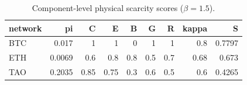 \begin{table}
\caption{Component-level physical scarcity scores ($\beta=1.5$).}
\label{tab:scarcity}
\begin{tabular}{lrrrrrrrr}
\toprule
network & pi & C & E & B & G & R & kappa & S \\
\midrule
BTC & 0.017 & 1 & 1 & 0 & 1 & 1 & 0.8 & 0.7797 \\
ETH & 0.0069 & 0.6 & 0.8 & 0.8 & 0.5 & 0.7 & 0.68 & 0.673 \\
TAO & 0.2035 & 0.85 & 0.75 & 0.3 & 0.6 & 0.5 & 0.6 & 0.4265 \\
\bottomrule
\end{tabular}
\end{table}
